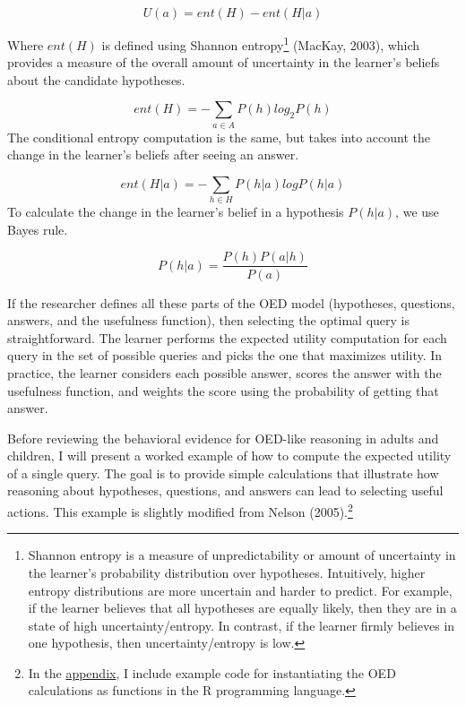 \documentclass[oneside]{report}
\begin{document}
\[U(a) = ent(H) - ent(H|a)\]

\noindent
Where \(ent(H)\) is defined using Shannon entropy\footnote{Shannon
  entropy is a measure of unpredictability or amount of uncertainty in
  the learner's probability distribution over hypotheses. Intuitively,
  higher entropy distributions are more uncertain and harder to predict.
  For example, if the learner believes that all hypotheses are equally
  likely, then they are in a state of high uncertainty/entropy. In
  contrast, if the learner firmly believes in one hypothesis, then
  uncertainty/entropy is low.} (MacKay, 2003), which provides a measure
of the overall amount of uncertainty in the learner's beliefs about the
candidate hypotheses.

\[ent(H) = -\sum_{a\in A}{P(h)log_2P(h)}\] \noindent
The conditional entropy computation is the same, but takes into account
the change in the learner's beliefs after seeing an answer.

\[ ent(H|a) = -\sum_{h\in H}{P(h|a)logP(h|a)} \] \noindent
To calculate the change in the learner's belief in a hypothesis
\(P(h|a)\), we use Bayes rule.

\[ P(h|a) = \frac{P(h)P(a|h)}{P(a)} \]

\noindent
If the researcher defines all these parts of the OED model (hypotheses,
questions, answers, and the usefulness function), then selecting the
optimal query is straightforward. The learner performs the expected
utility computation for each query in the set of possible queries and
picks the one that maximizes utility. In practice, the learner considers
each possible answer, scores the answer with the usefulness function,
and weights the score using the probability of getting that answer.

Before reviewing the behavioral evidence for OED-like reasoning in
adults and children, I will present a worked example of how to compute
the expected utility of a single query. The goal is to provide simple
calculations that illustrate how reasoning about hypotheses, questions,
and answers can lead to selecting useful actions. This example is
slightly modified from Nelson (2005).\footnote{In the
  \protect\hyperlink{app}{appendix}, I include example code for
  instantiating the OED calculations as functions in the R programming
  language.}
\end{document}
